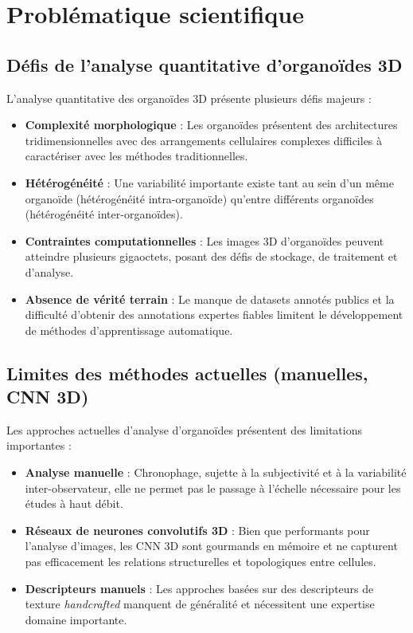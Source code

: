 \section{Problématique scientifique}

\subsection{Défis de l'analyse quantitative d'organoïdes 3D}

L'analyse quantitative des organoïdes 3D présente plusieurs défis majeurs :
\begin{itemize}
    \item \textbf{Complexité morphologique} : Les organoïdes présentent des architectures tridimensionnelles avec des arrangements cellulaires complexes difficiles à caractériser avec les méthodes traditionnelles.
    \item \textbf{Hétérogénéité} : Une variabilité importante existe tant au sein d'un même organoïde (hétérogénéité intra-organoïde) qu'entre différents organoïdes (hétérogénéité inter-organoïdes).
    \item \textbf{Contraintes computationnelles} : Les images 3D d'organoïdes peuvent atteindre plusieurs gigaoctets, posant des défis de stockage, de traitement et d'analyse.
    \item \textbf{Absence de vérité terrain} : Le manque de datasets annotés publics et la difficulté d'obtenir des annotations expertes fiables limitent le développement de méthodes d'apprentissage automatique.
\end{itemize}

\subsection{Limites des méthodes actuelles (manuelles, CNN 3D)}

Les approches actuelles d'analyse d'organoïdes présentent des limitations importantes :
\begin{itemize}
    \item \textbf{Analyse manuelle} : Chronophage, sujette à la subjectivité et à la variabilité inter-observateur, elle ne permet pas le passage à l'échelle nécessaire pour les études à haut débit.
    \item \textbf{Réseaux de neurones convolutifs 3D} : Bien que performants pour l'analyse d'images, les CNN 3D sont gourmands en mémoire et ne capturent pas efficacement les relations structurelles et topologiques entre cellules.
    \item \textbf{Descripteurs manuels} : Les approches basées sur des descripteurs de texture \textit{handcrafted} manquent de généralité et nécessitent une expertise domaine importante.
\end{itemize}

